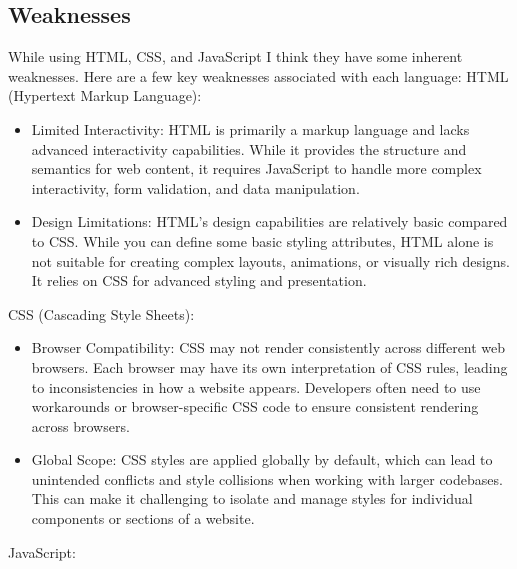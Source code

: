 \documentclass[a4paper, 11pt]{report}
\begin{document}
\subsection{Weaknesses}
While using HTML, CSS, and JavaScript I think they have some inherent weaknesses. Here are a few key weaknesses associated with each language:
HTML (Hypertext Markup Language):
\begin{itemize}
\item	Limited Interactivity: HTML is primarily a markup language and lacks advanced interactivity capabilities. While it provides the structure and semantics for web content, it requires JavaScript to handle more complex interactivity, form validation, and data manipulation.
\item	Design Limitations: HTML's design capabilities are relatively basic compared to CSS. While you can define some basic styling attributes, HTML alone is not suitable for creating complex layouts, animations, or visually rich designs. It relies on CSS for advanced styling and presentation.
\end{itemize}
CSS (Cascading Style Sheets):
\begin{itemize}
\item	Browser Compatibility: CSS may not render consistently across different web browsers. Each browser may have its own interpretation of CSS rules, leading to inconsistencies in how a website appears. Developers often need to use workarounds or browser-specific CSS code to ensure consistent rendering across browsers.
\item	Global Scope: CSS styles are applied globally by default, which can lead to unintended conflicts and style collisions when working with larger codebases. This can make it challenging to isolate and manage styles for individual components or sections of a website.
\end{itemize}
JavaScript:
\end{document}
